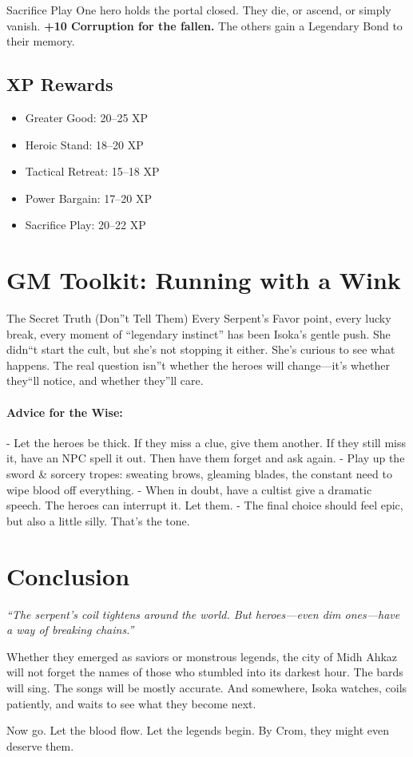 \documentclass[11pt]{article}
\begin{document}
\begin{mechanicsbox}{Sacrifice Play}
One hero holds the portal closed. They die, or ascend, or simply vanish. \textbf{+10 Corruption for the fallen.} The others gain a Legendary Bond to their memory.
\end{mechanicsbox}

\subsection*{XP Rewards}
\begin{itemize}
    \item Greater Good: 20--25 XP
    \item Heroic Stand: 18--20 XP
    \item Tactical Retreat: 15--18 XP
    \item Power Bargain: 17--20 XP
    \item Sacrifice Play: 20--22 XP
\end{itemize}

\section*{GM Toolkit: Running with a Wink}

\begin{sorcerybox}{The Secret Truth (Don''t Tell Them)}
Every Serpent's Favor point, every lucky break, every moment of ``legendary instinct'' has been Isoka's gentle push. She didn``t start the cult, but she's not stopping it either. She's curious to see what happens. The real question isn''t whether the heroes will change---it's whether they``ll notice, and whether they''ll care.
\end{sorcerybox}

\paragraph{Advice for the Wise:}
- Let the heroes be thick. If they miss a clue, give them another. If they still miss it, have an NPC spell it out. Then have them forget and ask again.
- Play up the sword & sorcery tropes: sweating brows, gleaming blades, the constant need to wipe blood off everything.
- When in doubt, have a cultist give a dramatic speech. The heroes can interrupt it. Let them.
- The final choice should feel epic, but also a little silly. That's the tone.

\section*{Conclusion}
\textit{``The serpent's coil tightens around the world. But heroes---even dim ones---have a way of breaking chains.''}

Whether they emerged as saviors or monstrous legends, the city of Midh Ahkaz will not forget the names of those who stumbled into its darkest hour. The bards will sing. The songs will be mostly accurate. And somewhere, Isoka watches, coils patiently, and waits to see what they become next.

Now go. Let the blood flow. Let the legends begin. By Crom, they might even deserve them.


\end{document}
